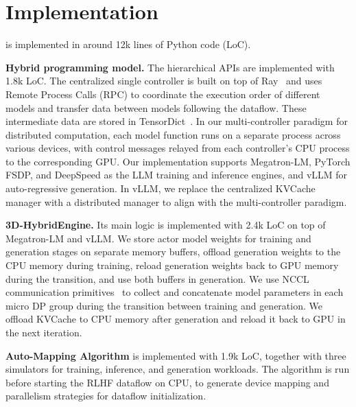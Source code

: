 \section{Implementation} \label{sec:impl}
\sysname{} is implemented in around 12k lines of Python code (LoC). %



\noindent \textbf{Hybrid programming model.}
The hierarchical APIs are implemented with 1.8k LoC. %
The centralized single controller is built on top of Ray~\cite{moritz2018ray} and uses Remote Process Calls (RPC) to coordinate the execution order of different models and transfer data between models following the dataflow.
These intermediate data are stored in TensorDict~\cite{paszke2019pytorch}.
{In our multi-controller paradigm for distributed computation, each model function runs on a separate process across various devices, with control messages relayed from each controller's CPU process to the corresponding GPU.}
Our implementation supports Megatron-LM, PyTorch FSDP, and DeepSpeed as the LLM training and inference engines, and vLLM for auto-regressive generation. %
In vLLM, we replace the centralized KVCache manager with a distributed manager to align with the multi-controller paradigm.




\noindent \textbf{3D-HybridEngine.} Its main logic %
is implemented with 2.4k LoC on top of Megatron-LM and vLLM. We %
store actor model weights for training and generation stages on separate memory buffers, offload generation weights to the CPU memory during training, reload generation weights back to GPU memory during the transition, and use both buffers in generation. 
We %
use NCCL communication primitives~\cite{jeaugey2017nccl} to collect and concatenate model parameters in each micro DP group during the transition between training and generation. We offload KVCache to CPU memory after generation and reload it back to GPU in the next iteration. %

\noindent\textbf{Auto-Mapping Algorithm}
is implemented with 1.9k LoC, together with three simulators for training, inference, and generation workloads. The algorithm is run before starting the RLHF dataflow on CPU, to generate device mapping and parallelism strategies for dataflow initialization. 





